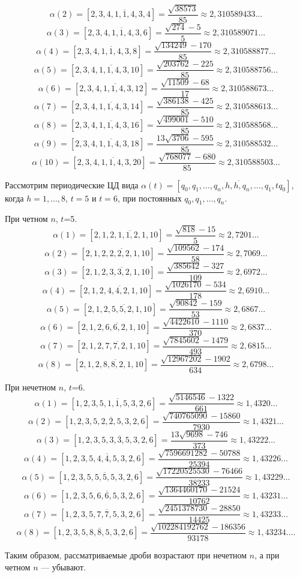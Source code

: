 \begin{exampler}
\[\alpha(2)=[2,\overline{3,4,1,1,4,3,4}]=\frac {\sqrt{38573}}{85}\approx 2,310589433\dots\]
\[\alpha(3)=[2,\overline{3,4,1,1,4,3,6}]=\frac{\sqrt{274}-5}{5}\approx 2,310589071\dots\]
\[\alpha(4)=[2,\overline{3,4,1,1,4,3,8}]=\frac {\sqrt{134249}-170}{85}\approx 2,310588877\dots\]
\[\alpha(5)=[2,\overline{3,4,1,1,4,3,10}]=\frac {\sqrt{203762}-225}{85}\approx 2,310588756\dots\]
\[\alpha(6)=[2,\overline{3,4,1,1,4,3,12}]=\frac {\sqrt{11509}-68}{17}\approx 2,310588673\dots\]
\[\alpha(7)=[2,\overline{3,4,1,1,4,3,14}]=\frac {\sqrt{386138}-425}{85}\approx 2,310588613\dots\]
\[\alpha(8)=[2,\overline{3,4,1,1,4,3,16}]=\frac{\sqrt{499001}-510}{85}\approx 2,310588568\dots\]
\[\alpha(9)=[2,\overline{3,4,1,1,4,3,18}]=\frac {13\sqrt{3706}-595}{85}\approx 2,310588532\dots\]
\[\alpha(10)=[2,\overline{3,4,1,1,4,3,20}]=\frac {\sqrt{768077}-680}{85}\approx 2,310588503\dots\]
\end{exampler}

Рассмотрим периодические ЦД вида $\alpha(t)=[{q_0},\overline{{q_1},\dots,{q_n},{h},{h},{q_n},\dots,{q_1},{t{q_0}}}]$,
когда $h=1,\dots,8$, $t=5$ и $t=6$, при постоянных ${q_0},{q_1},\dots,{q_n}.$

\begin{exampler} При четном $n$, $t$=5.
\[\alpha(1)=[2,\overline{1,2,1,1,2,1,10}]=\frac {\sqrt{818}-15}{5}\approx 2,7201\dots\]
\[\alpha(2)=[2,\overline{1,2,2,2,2,1,10}]=\frac {\sqrt{109562}-174}{58}\approx 2,7069\dots\]
\[\alpha(3)=[2,\overline{1,2,3,3,2,1,10}]=\frac {\sqrt{385642}-327}{109}\approx 2,6972\dots\]
\[\alpha(4)=[2,\overline{1,2,4,4,2,1,10}]=\frac {\sqrt{1026170}-534}{178}\approx 2,6910\dots\]
\[\alpha(5)=[2,\overline{1,2,5,5,2,1,10}]=\frac {\sqrt{90842}-159}{53}\approx 2,6867\dots\]
\[\alpha(6)=[2,\overline{1,2,6,6,2,1,10}]=\frac {\sqrt{4422610}-1110}{370}\approx 2,6837\dots\]
\[\alpha(7)=[2,\overline{1,2,7,7,2,1,10}]=\frac {\sqrt{7845602}-1479}{493}\approx 2,6815\dots\]
\[\alpha(8)=[2,\overline{1,2,8,8,2,1,10}]=\frac {\sqrt{12967202}-1902}{634}\approx 2,6798\dots\]
\end{exampler}

\begin{exampler} При нечетном $n$, $t$=6.
\[\alpha(1)=[1,\overline{2,3,5,1,1,5,3,2,6}]=\frac {\sqrt{5146546}-1322}{661}\approx 1,4320\dots\]
\[\alpha(2)=[1,\overline{2,3,5,2,2,5,3,2,6}]=\frac {\sqrt{740765090}-15860}{7930}\approx 1,4321\dots\]
\[\alpha(3)=[1,\overline{2,3,5,3,3,5,3,2,6}]=\frac {13\sqrt{9698}-746}{373}\approx 1,43222\dots\]
\[\alpha(4)=[1,\overline{2,3,5,4,4,5,3,2,6}]=\frac {\sqrt{7596691282}-50788}{25394}\approx 1,43226\dots\]
\[\alpha(5)=[1,\overline{2,3,5,5,5,5,3,2,6}]=\frac {\sqrt{17220525530}-76466}{38233}\approx 1,43229\dots\]
\[\alpha(6)=[1,\overline{2,3,5,6,6,5,3,2,6}]=\frac {\sqrt{1364460170}-21524}{10762}\approx 1,43231\dots\]
\[\alpha(7)=[1,\overline{2,3,5,7,7,5,3,2,6}]=\frac {\sqrt{2451378730}-28850}{14425}\approx 1,43233\dots\]
\[\alpha(8)=[1,\overline{2,3,5,8,8,5,3,2,6}]=\frac {\sqrt{102284192762}-186356}{93178}\approx 1,43234\dots.\]
\end{exampler}
Таким образом, рассматриваемые дроби возрастают при нечетном $n$, а при четном $n$ --- убывают.

